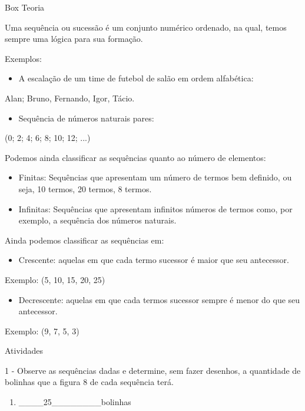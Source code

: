 Box Teoria

Uma sequência ou sucessão é um conjunto numérico ordenado, na qual,
temos sempre uma lógica para sua formação.

Exemplos:

\begin{itemize}
\item
  A escalação de um time de futebol de salão em ordem alfabética:
\end{itemize}

Alan; Bruno, Fernando, Igor, Tácio.

\begin{itemize}
\item
  Sequência de números naturais pares:
\end{itemize}

(0; 2; 4; 6; 8; 10; 12; ...)

Podemos ainda classificar as sequências quanto ao número de elementos:

\begin{itemize}
\item
  Finitas: Sequências que apresentam um número de termos bem definido,
  ou seja, 10 termos, 20 termos, 8 termos.
\item
  Infinitas: Sequências que apresentam infinitos números de termos como,
  por exemplo, a sequência dos números naturais.
\end{itemize}

Ainda podemos classificar as sequências em:

\begin{itemize}
\item
  Crescente: aquelas em que cada termo sucessor é maior que seu
  antecessor.
\end{itemize}

Exemplo: (5, 10, 15, 20, 25)

\begin{itemize}
\item
  Decrescente: aquelas em que cada termos sucessor sempre é menor do que
  seu antecessor.
\end{itemize}

Exemplo: (9, 7, 5, 3)

Atividades

1 - Observe as sequências dadas e determine, sem fazer desenhos, a
quantidade de bolinhas que a figura 8 de cada sequência terá.

\begin{enumerate}
\def\labelenumi{\alph{enumi})}
\item
  \_\_\_\_25\_\_\_\_\_\_\_\_bolinhas
\end{enumerate}

